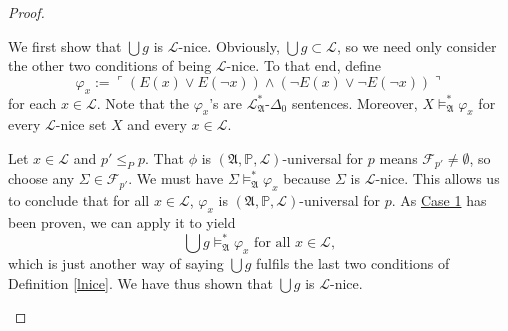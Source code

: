 \documentclass[12pt, twoside]{memoir}
\numberwithin{equation}{section}
\theoremstyle{definition}
\theoremstyle{remark}
\theoremstyle{definition}
\theoremstyle{definition}
\theoremstyle{definition}
\theoremstyle{remark}
\begin{document}
\begin{proof}
\begin{enumerate}[label=Case \arabic*:, leftmargin=50pt]
    We first show that $\bigcup g$ is $\mathcal{L}$-nice. Obviously, $\bigcup g \subset \mathcal{L}$, so we need only consider the other two conditions of being $\mathcal{L}$-nice. To that end, define $$\varphi_x := \ulcorner (E(x) \vee E(\neg x)) \wedge (\neg E(x) \vee \neg E(\neg x)) \urcorner$$ for each $x \in \mathcal{L}$. Note that the $\varphi_x$'s are $\mathcal{L}^{*}_{\mathfrak{A}}$-$\Delta_0$ sentences. Moreover, $X \models^{*}_{\mathfrak{A}} \varphi_x$ for every $\mathcal{L}$-nice set $X$ and every $x \in \mathcal{L}$. 
    
    Let $x \in \mathcal{L}$ and $p' \leq_{P} p$. That $\phi$ is $(\mathfrak{A}, \mathbb{P}, \mathcal{L})$-universal for $p$ means $\mathcal{F}_{p'} \neq \emptyset$, so choose any $\Sigma \in \mathcal{F}_{p'}$. We must have $\Sigma \models^{*}_{\mathfrak{A}} \varphi_x$ because $\Sigma$ is $\mathcal{L}$-nice. This allows us to conclude that for all $x \in \mathcal{L}$, $\varphi_x$ is $(\mathfrak{A}, \mathbb{P}, \mathcal{L})$-universal for $p$. As \hyperref[526c1]{Case 1} has been proven, we can apply it to yield $$\bigcup g \models^{*}_{\mathfrak{A}} \varphi_x \text{ for all } x \in \mathcal{L},$$ which is just another way of saying $\bigcup g$ fulfils the last two conditions of Definition \ref{lnice}. We have thus shown that $\bigcup g$ is $\mathcal{L}$-nice. 
    

\end{enumerate}
\end{proof}
\end{document}
